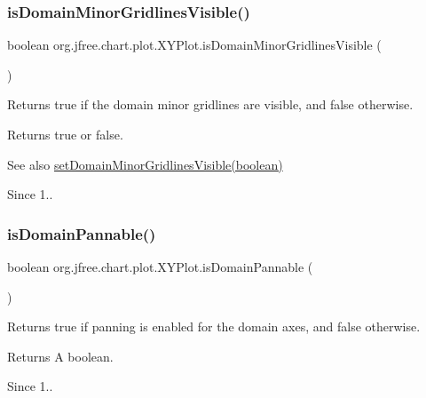 \subsubsection{\texorpdfstring{is\+Domain\+Minor\+Gridlines\+Visible()}{isDomainMinorGridlinesVisible()}}
{\footnotesize\ttfamily boolean org.\+jfree.\+chart.\+plot.\+X\+Y\+Plot.\+is\+Domain\+Minor\+Gridlines\+Visible (\begin{DoxyParamCaption}{ }\end{DoxyParamCaption})}

Returns {\ttfamily true} if the domain minor gridlines are visible, and {\ttfamily false} otherwise.

\begin{DoxyReturn}{Returns}
{\ttfamily true} or {\ttfamily false}.
\end{DoxyReturn}
\begin{DoxySeeAlso}{See also}
\mbox{\hyperlink{classorg_1_1jfree_1_1chart_1_1plot_1_1_x_y_plot_a1ebc5cb4d9ff174ef5bec54ac9f60377}{set\+Domain\+Minor\+Gridlines\+Visible(boolean)}}
\end{DoxySeeAlso}
\begin{DoxySince}{Since}
1.. 
\end{DoxySince}
\mbox{\label{classorg_1_1jfree_1_1chart_1_1plot_1_1_x_y_plot_a47e998c45ef12fd238c3477c38655c2b}} 
\subsubsection{\texorpdfstring{is\+Domain\+Pannable()}{isDomainPannable()}}
{\footnotesize\ttfamily boolean org.\+jfree.\+chart.\+plot.\+X\+Y\+Plot.\+is\+Domain\+Pannable (\begin{DoxyParamCaption}{ }\end{DoxyParamCaption})}

Returns {\ttfamily true} if panning is enabled for the domain axes, and {\ttfamily false} otherwise.

\begin{DoxyReturn}{Returns}
A boolean.
\end{DoxyReturn}
\begin{DoxySince}{Since}
1.. 
\end{DoxySince}


